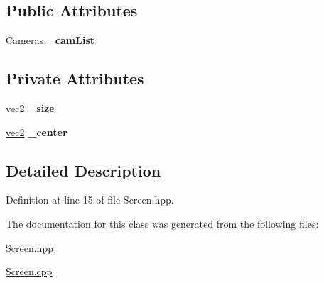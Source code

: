 \subsection*{Public Attributes}
\begin{DoxyCompactItemize}
\item 
\hypertarget{class_screen_a0098c32ec26cba2df8108d7b706986e5}{\hyperlink{class_cameras}{Cameras} {\bfseries \-\_\-cam\-List}}\label{class_screen_a0098c32ec26cba2df8108d7b706986e5}

\end{DoxyCompactItemize}
\subsection*{Private Attributes}
\begin{DoxyCompactItemize}
\item 
\hypertarget{class_screen_a02a1812a3807a9c4db6d4456861a7130}{\hyperlink{struct_angel_1_1vec2}{vec2} {\bfseries \-\_\-size}}\label{class_screen_a02a1812a3807a9c4db6d4456861a7130}

\item 
\hypertarget{class_screen_a1c82610b27dd93ae998b96d1fe11c792}{\hyperlink{struct_angel_1_1vec2}{vec2} {\bfseries \-\_\-center}}\label{class_screen_a1c82610b27dd93ae998b96d1fe11c792}

\end{DoxyCompactItemize}


\subsection{Detailed Description}


Definition at line 15 of file Screen.\-hpp.



The documentation for this class was generated from the following files\-:\begin{DoxyCompactItemize}
\item 
\hyperlink{_screen_8hpp}{Screen.\-hpp}\item 
\hyperlink{_screen_8cpp}{Screen.\-cpp}\end{DoxyCompactItemize}
